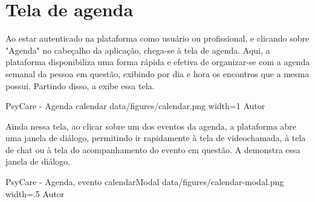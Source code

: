 \section{Tela de agenda}
\label{sec:agenda}

Ao estar autenticado na plataforma como usuário ou profissional, e clicando sobre "Agenda" no cabeçalho da aplicação, chega-se à tela de agenda. Aqui, a plataforma disponibiliza uma forma rápida e efetiva de organizar-se com a agenda semanal da pessoa em questão, exibindo por dia e hora os encontros que a mesma possui. Partindo disso, a  exibe essa tela.

\image
    {PsyCare - Agenda}
    {calendar}
    {data/figures/calendar.png}
    {width=1\textwidth}
    {Autor}

Ainda nessa tela, ao clicar sobre um dos eventos da agenda, a plataforma abre uma janela de diálogo, permitindo ir rapidamente à tela de videochamada, à tela de chat ou à tela do acompanhamento do evento em questão. A  demonstra essa janela de diálogo.

\image
    {PsyCare - Agenda, evento}
    {calendarModal}
    {data/figures/calendar-modal.png}
    {width=.5\textwidth}
    {Autor}